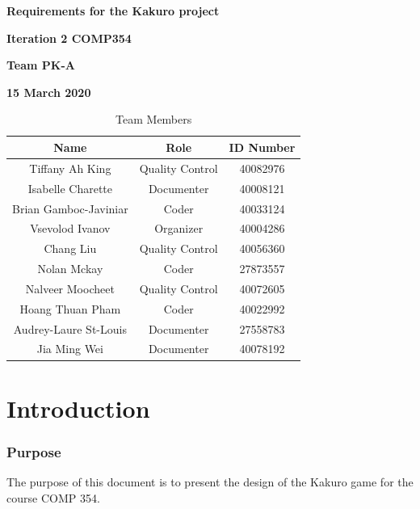 \documentclass[12pt]{article}
\begin{document}
\vspace*{0.5in}
\centerline{\bf\Large
Requirements for the Kakuro project}


\vspace*{0.5in}
\centerline{\bf\Large Iteration 2 COMP354}

\vspace*{0.5in}
\centerline{\bf\Large Team PK-A}

\vspace*{0.5in}
\centerline{\bf\Large 15 March 2020}

\vspace*{1.5in}
\begin{table}[htbp]
\caption{Team Members}
\begin{center}
\begin{tabular}{|c |c | c|}
\hline
Name & Role & ID Number \\
\hline\hline
Tiffany Ah King & Quality Control & 40082976 \\
\hline
Isabelle Charette & Documenter & 40008121 \\
\hline
Brian Gamboc-Javiniar & Coder & 40033124 \\
\hline
Vsevolod Ivanov & Organizer & 40004286 \\
\hline
Chang Liu & Quality Control & 40056360 \\
\hline
Nolan Mckay & Coder & 27873557 \\
\hline
Nalveer Moocheet & Quality Control & 40072605 \\
\hline
Hoang Thuan Pham & Coder & 40022992 \\
\hline
Audrey-Laure St-Louis & Documenter & 27558783 \\
\hline
Jia Ming Wei & Documenter & 40078192 \\
\hline
\end{tabular}
\end{center}
\end{table}


\newpage

\renewcommand*\contentsname{Table of Contents}

\tableofcontents

\clearpage

\section{Introduction}

\subsubsection{Purpose}
The purpose of this document is to present the design of the Kakuro game for the course COMP 354. 
\end{document}
